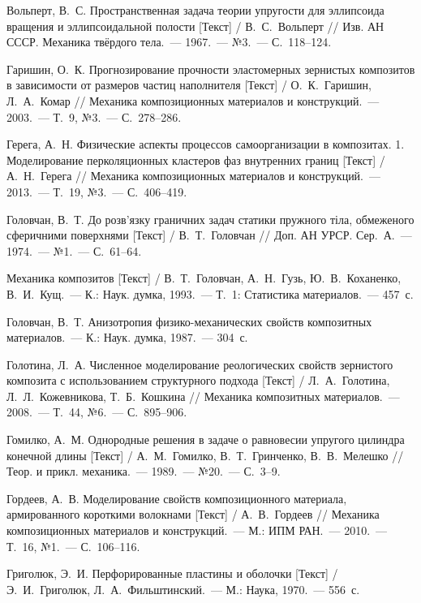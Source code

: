 \begin{biblist}{99}
Вольперт, В.~С. 
Пространственная задача теории упругости для эллипсоида вращения и эллипсоидальной полости [Текст] 
/ В.~С.~Вольперт 
// Изв. АН СССР. Механика твёрдого тела.~--- 1967.~--- №3.~--- С.~118--124.

Гаришин, О.~К. 
Прогнозирование прочности эластомерных зернистых композитов в зависимости от размеров частиц наполнителя [Текст] 
/ О.~К.~Гаришин, Л.~А.~Комар 
// Механика композиционных материалов и конструкций.~--- 2003.~--- Т.~9, №3.~--- С.~278--286.

Герега, А.~Н. 
Физические аспекты процессов самоорганизации в композитах. 1. Моделирование перколяционных кластеров фаз внутренних границ [Текст] 
/ А.~Н.~Герега 
// Механика композиционных материалов и конструкций.~--- 2013.~--- Т.~19, №3.~--- С.~406--419.

Головчан, В.~Т. 
До розв’язку граничних задач статики пружного тіла, обмеженого сферичними поверхнями [Текст] 
/ В.~Т.~Головчан 
// Доп. АН УРСР. Сер.~А.~--- 1974.~--- №1.~--- С.~61--64.

Механика композитов [Текст] 
/ В.~Т.~Головчан, А.~Н.~Гузь, Ю.~В.~Коханенко, В.~И.~Кущ.~--- К.: Наук. думка, 1993.~--- Т.~1: Статистика материалов.~--- 457~с.

Головчан, В.~Т. 
Анизотропия физико-механических свойств композитных материалов.~--- К.: Наук. думка, 1987.~--- 304~с.

Голотина, Л.~А. 
Численное моделирование реологических свойств зернистого композита с использованием структурного подхода [Текст] 
/ Л.~А.~Голотина, Л.~Л.~Кожевникова, Т.~Б.~Кошкина 
// Механика композитных материалов.~--- 2008.~--- Т.~44, №6.~--- С.~895--906.

Гомилко, А.~М. 
Однородные решения в задаче о равновесии упругого цилиндра конечной длины [Текст] 
/ А.~М.~Гомилко, В.~Т.~Гринченко, В.~В.~Мелешко 
// Теор. и прикл. механика.~--- 1989.~--- №20.~--- С.~3--9.

Гордеев, А.~В. 
Моделирование свойств композиционного материала, армированного короткими волокнами [Текст] 
/ А.~В.~Гордеев 
// Механика композиционных материалов и конструкций.~--- М.: ИПМ РАН.~--- 2010.~--- Т.~16, №1.~--- С.~106--116.

Григолюк, Э.~И. 
Перфорированные пластины и оболочки [Текст] 
/ Э.~И.~Григолюк, Л.~А.~Фильштинский.~--- М.: Наука, 1970.~--- 556~с.


\end{biblist}
